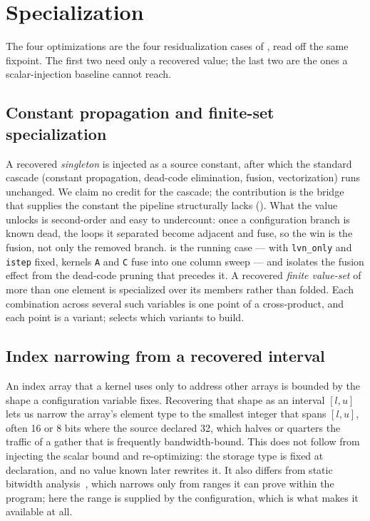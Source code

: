 \section{Specialization}
\label{sec:spec}

The four optimizations are the four residualization cases of , read off the same fixpoint. The first two need only a recovered value; the last two are the ones a scalar-injection baseline cannot reach.

\subsection{Constant propagation and finite-set specialization}
A recovered \emph{singleton} is injected as a source constant, after which the standard cascade (constant propagation, dead-code elimination, fusion, vectorization) runs unchanged. We claim no credit for the cascade; the contribution is the bridge that supplies the constant the pipeline structurally lacks (). What the value unlocks is second-order and easy to undercount: once a configuration branch is known dead, the loops it separated become adjacent and fuse, so the win is the fusion, not only the removed branch.  is the running case --- with \texttt{lvn\_only} and \texttt{istep} fixed, kernels \texttt{A} and \texttt{C} fuse into one column sweep --- and  isolates the fusion effect from the dead-code pruning that precedes it.
A recovered \emph{finite value-set} of more than one element is specialized over its members rather than folded. Each combination across several such variables is one point of a cross-product, and each point is a variant;  selects which variants to build.

\subsection{Index narrowing from a recovered interval}
An index array that a kernel uses only to address other arrays is bounded by the shape a configuration variable fixes. Recovering that shape as an interval $[l,u]$ lets us narrow the array's element type to the smallest integer that spans $[l,u]$, often 16 or 8 bits where the source declared 32, which halves or quarters the traffic of a gather that is frequently bandwidth-bound. This does not follow from injecting the scalar bound and re-optimizing: the storage type is fixed at declaration, and no value known later rewrites it. It also differs from static bitwidth analysis~\cite{bitwise}, which narrows only from ranges it can prove within the program; here the range is supplied by the configuration, which is what makes it available at all.

